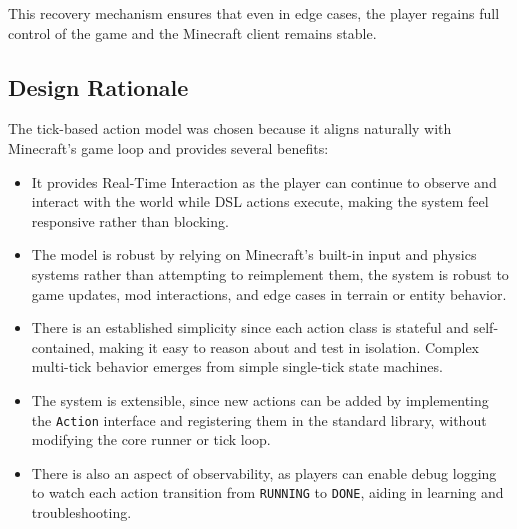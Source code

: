 This recovery mechanism ensures that even in edge cases, the player regains full control of the game and the Minecraft client remains stable.

\subsection{Design Rationale}

The tick-based action model was chosen because it aligns naturally with Minecraft's game loop and provides several benefits:

\begin{itemize}
\item[--] It provides Real-Time Interaction as the player can continue to observe and interact with the world while DSL actions execute, making the system feel responsive rather than blocking.

\item[--] The model is robust by relying on Minecraft's built-in input and physics systems rather than attempting to reimplement them, the system is robust to game updates, mod interactions, and edge cases in terrain or entity behavior.

\item[--] There is an established simplicity since each action class is stateful and self-contained, making it easy to reason about and test in isolation. Complex multi-tick behavior emerges from simple single-tick state machines.

\item[--] The system is extensible, since new actions can be added by implementing the \texttt{Action} interface and registering them in the standard library, without modifying the core runner or tick loop.

\item[--] There is also an aspect of observability, as players can enable debug logging to watch each action transition from \texttt{RUNNING} to \texttt{DONE}, aiding in learning and troubleshooting.
\end{itemize}

